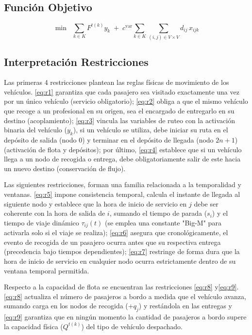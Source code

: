 \subsection{Función Objetivo}
\vspace{-0.8cm}
\begin{equation}
\label{eq:obj}
\min \;\; \sum_{k\in K} F^{t(k)} y_k \;+\; c^{\mathrm{var}} \sum_{k\in K}\sum_{(i,j)\in V\times V} d_{ij}\, x_{ijk}
\end{equation}


\subsection{Interpretación Restricciones}
Las primeras 4 restricciones plantean las reglas físicas de movimiento de los vehículos. \protect\eqref{eq:r1} garantiza que cada pasajero sea visitado exactamente una vez por un único vehículo (servicio obligatorio); \protect\eqref{eq:r2} obliga a que el mismo vehículo que recoge a un profesional en su origen, sea el encargado de entregarlo en su destino (acoplamiento); \protect\eqref{eq:r3} vincula las variables de ruteo con la activación binaria del vehículo ($y_k$), si un vehículo se utiliza, debe iniciar su ruta en el depósito de salida (nodo 0) y terminar en el depósito de llegada (nodo $2n+1$) (activación de flota y depósitos); por último, \protect\eqref{eq:r4} establece que si un vehículo llega a un nodo de recogida o entrega, debe obligatoriamente salir de este hacia un nuevo destino (conservación de flujo).

Las siguientes restricciones, forman una familia relacionada a la temporalidad y ventanas. \protect\eqref{eq:r5} impone consistencia temporal,  calcula el instante de llegada al siguiente nodo y establece que la hora de inicio de servicio en $j$ debe ser coherente con la hora de salida de $i$, sumando el tiempo de parada ($s_i$) y el tiempo de viaje dinámico $\tau_{ij}(t)$ (se emplea una constante "Big-M" para activarla solo si el viaje se realiza); \protect\eqref{eq:r6} asegura que cronológicamente, el evento de recogida de un pasajero ocurra antes que su respectiva entrega (precedencia bajo tiempos dependientes); \protect\eqref{eq:r7} restringe de forma dura que la hora de inicio de servicio en cualquier nodo ocurra estrictamente dentro de su ventana temporal permitida.

Respecto a la capacidad de flota se encuentran las restricciones \protect\eqref{eq:r8} y\protect\eqref{eq:r9}. \protect\eqref{eq:r8}  actualiza el número de pasajeros a bordo a medida que el vehículo avanza, sumando carga en los nodos de recogida ($+q_j$) y restándola en las entregas y \protect\eqref{eq:r9} garantiza que en ningún momento la cantidad de pasajeros a bordo supere la capacidad física ($Q^{t(k)}$) del tipo de vehículo despachado.

